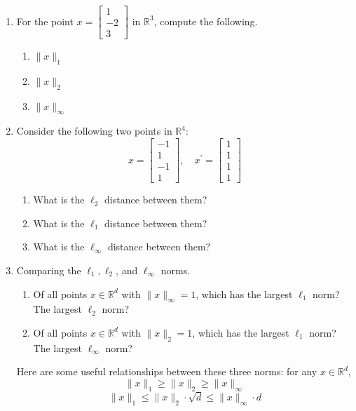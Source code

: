 \documentclass{article}
\begin{document}
\begin{enumerate}

\item For the point $x=\begin{bmatrix} 1 \\ -2 \\ 3 \end{bmatrix}$ in $\mathbb{R}^{3}$, compute the following.
    \begin{enumerate}
    \item $\|x\|_{1}$
    \item $\|x\|_{2}$
    \item $\|x\|_{\infty}$
    \end{enumerate}

\item Consider the following two points in $\mathbb{R}^{4}$:
    \[
    x=\begin{bmatrix} -1 \\ 1 \\ -1 \\ 1 \end{bmatrix}, \quad x^{\prime}=\begin{bmatrix} 1 \\ 1 \\ 1 \\ 1 \end{bmatrix}
    \]
    \begin{enumerate}
    \item What is the $\ell_{2}$ distance between them?
    \item What is the $\ell_{1}$ distance between them?
    \item What is the $\ell_{\infty}$ distance between them?
    \end{enumerate}

\item Comparing the $\ell_{1}, \ell_{2}$, and $\ell_{\infty}$ norms.
    \begin{enumerate}
    \item Of all points $x \in \mathbb{R}^{d}$ with $\|x\|_{\infty}=1$, which has the largest $\ell_{1}$ norm? The largest $\ell_{2}$ norm?
    \item Of all points $x \in \mathbb{R}^{d}$ with $\|x\|_{2}=1$, which has the largest $\ell_{1}$ norm? The largest $\ell_{\infty}$ norm?
    \end{enumerate}

    Here are some useful relationships between these three norms: for any $x \in \mathbb{R}^{d}$,
    \[
    \|x\|_{1} \geq \|x\|_{2} \geq \|x\|_{\infty}
    \]
    \[
    \|x\|_{1} \leq \|x\|_{2} \cdot \sqrt{d} \leq \|x\|_{\infty} \cdot d
    \]


\end{enumerate}
\end{document}
